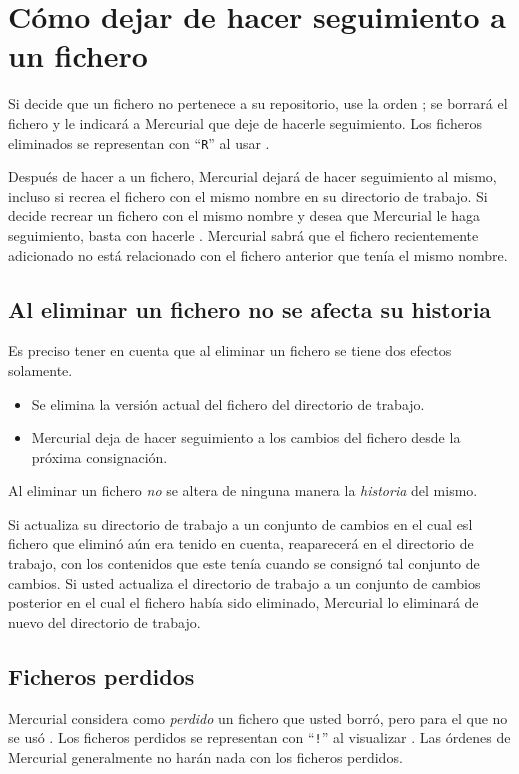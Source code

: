 \section{Cómo dejar de hacer seguimiento a un fichero}

Si decide que un fichero no pertenece a su repositorio, use la orden
; se borrará el fichero y le indicará a Mercurial que
deje de hacerle seguimiento.  Los ficheros eliminados se representan
con ``\texttt{R}'' al usar .

Después de hacer  a un fichero, Mercurial dejará de
hacer seguimiento al mismo, incluso si recrea el fichero con el mismo
nombre en su directorio de trabajo. Si decide recrear un fichero con
el mismo nombre y desea que Mercurial le haga seguimiento, basta con
hacerle . Mercurial sabrá que el fichero recientemente
adicionado no está relacionado con el fichero anterior que tenía el
mismo nombre.

\subsection{Al eliminar un fichero no se afecta su historia}

Es preciso tener en cuenta que al eliminar un fichero se tiene
dos efectos solamente.
\begin{itemize}
\item Se elimina la versión actual del fichero del directorio de 
trabajo.
\item Mercurial deja de hacer seguimiento a los cambios del fichero
  desde la próxima consignación.
\end{itemize}
Al eliminar un fichero \emph{no} se altera de ninguna manera la
\emph{historia} del mismo.

Si actualiza su directorio de trabajo a un conjunto de cambios en el
cual esl fichero que eliminó aún era tenido en cuenta, reaparecerá en
el directorio de trabajo, con los contenidos que este tenía cuando se
consignó tal conjunto de cambios.  Si usted actualiza el directorio de
trabajo a un conjunto de cambios posterior en el cual el fichero había
sido eliminado, Mercurial lo eliminará de nuevo del directorio de
trabajo.

\subsection{Ficheros perdidos}

Mercurial considera como \emph{perdido} un fichero que usted borró,
pero para el que no se usó .  Los ficheros perdidos se
representan con ``\texttt{!}'' al visualizar .
Las órdenes de Mercurial generalmente no harán nada con los ficheros
perdidos.


